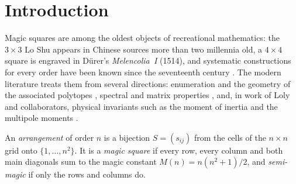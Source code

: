 \section{Introduction}
\label{sec:introduction}

Magic squares are among the oldest objects of recreational mathematics: the $3\times3$ Lo Shu appears in Chinese sources more than two millennia old, a $4\times4$ square is engraved in D\"urer's \emph{Melencolia~I} (1514), and systematic constructions for every order have been known since the seventeenth century \cite{andrews1960magic,pickover2002zen}.
The modern literature treats them from several directions: enumeration and the geometry of the associated polytopes \cite{stanley1973magic,ehrhart1973magic,ahmed2003polyhedral,beck2006insideout,beck2010enumeration}, spectral and matrix properties \cite{loly2009spectra,nordgren2012properties,nordgren2014spectra,cameron2013signatura}, and, in work of Loly and collaborators, physical invariants such as the moment of inertia and the multipole moments \cite{loly2004invariance,rogers2004inertia,rogers2005multipole}.

\begin{definition}
\label{def:magic_square}
An \emph{arrangement} of order $n$ is a bijection $S=(s_{ij})$ from the cells of the $n\times n$ grid onto $\{1,\dots,n^2\}$.
It is a \emph{magic square} if every row, every column and both main diagonals sum to the magic constant $M(n)=n(n^2+1)/2$, and \emph{semi-magic} if only the rows and columns do.
\end{definition}


